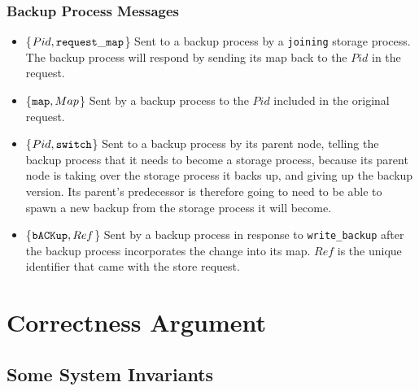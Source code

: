 \documentclass[a4paper]{article}
\begin{document}
\subsubsection{Backup Process Messages}

\begin{itemize}
\item\{$Pid, {\tt request\_map}$\} Sent to a backup process by a {\tt joining} storage process. The backup process will respond by sending its map back to the $Pid$ in the request.
\item\{${\tt map}, Map$\} Sent by a backup process to the $Pid$ included in the original request.
\item\{$Pid, {\tt switch}$\} Sent to a backup process by its parent node, telling the backup process that it needs to become a storage process, because its parent node is taking over the storage process it backs up, and giving up the backup version. Its parent's predecessor is therefore going to need to be able to spawn a new backup from the storage process it will become.
\item\{${\tt bACKup}, Ref$\} Sent by a backup process in response to {\tt write\_backup} after the backup process incorporates the change into its map. $Ref$ is the unique identifier that came with the store request.
\end{itemize}

\section{Correctness Argument}

\subsection{Some System Invariants}
\end{document}
